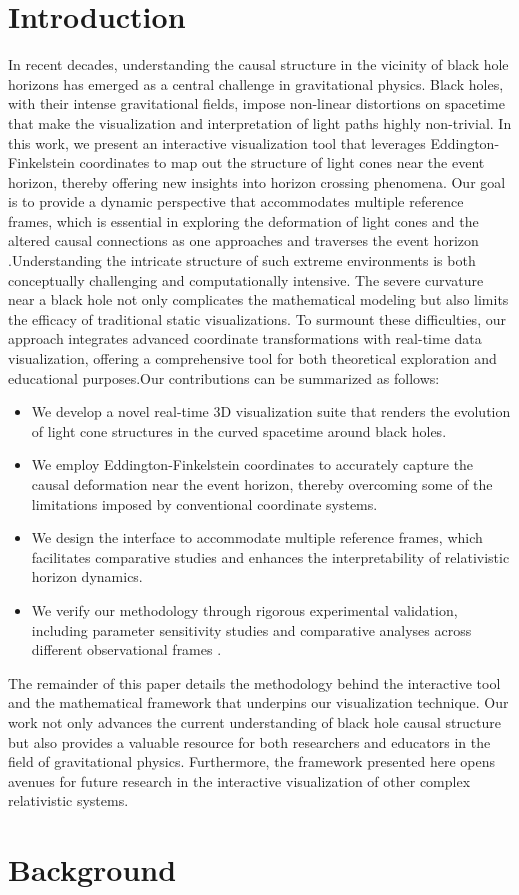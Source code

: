 \documentclass{article}
\begin{document}
\section{Introduction}In recent decades, understanding the causal structure in the vicinity of black hole horizons has emerged as a central challenge in gravitational physics. Black holes, with their intense gravitational fields, impose non-linear distortions on spacetime that make the visualization and interpretation of light paths highly non-trivial. In this work, we present an interactive visualization tool that leverages Eddington-Finkelstein coordinates to map out the structure of light cones near the event horizon, thereby offering new insights into horizon crossing phenomena. Our goal is to provide a dynamic perspective that accommodates multiple reference frames, which is essential in exploring the deformation of light cones and the altered causal connections as one approaches and traverses the event horizon \cite{Einstein1916, Hawking1973}.Understanding the intricate structure of such extreme environments is both conceptually challenging and computationally intensive. The severe curvature near a black hole not only complicates the mathematical modeling but also limits the efficacy of traditional static visualizations. To surmount these difficulties, our approach integrates advanced coordinate transformations with real-time data visualization, offering a comprehensive tool for both theoretical exploration and educational purposes.Our contributions can be summarized as follows:\begin{itemize}    \item We develop a novel real-time 3D visualization suite that renders the evolution of light cone structures in the curved spacetime around black holes.    \item We employ Eddington-Finkelstein coordinates to accurately capture the causal deformation near the event horizon, thereby overcoming some of the limitations imposed by conventional coordinate systems.    \item We design the interface to accommodate multiple reference frames, which facilitates comparative studies and enhances the interpretability of relativistic horizon dynamics.    \item We verify our methodology through rigorous experimental validation, including parameter sensitivity studies and comparative analyses across different observational frames \cite{Penrose1965, Misner1973}.\end{itemize}The remainder of this paper details the methodology behind the interactive tool and the mathematical framework that underpins our visualization technique. Our work not only advances the current understanding of black hole causal structure but also provides a valuable resource for both researchers and educators in the field of gravitational physics. Furthermore, the framework presented here opens avenues for future research in the interactive visualization of other complex relativistic systems.\section{Background}
\end{document}

